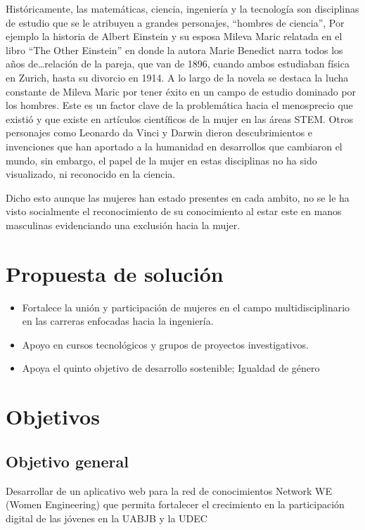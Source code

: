 \documentclass[hidelinks]{Documento}
\begin{document}
Históricamente, las matemáticas, ciencia, ingeniería y la tecnología son disciplinas de estudio que se le atribuyen a grandes personajes, “hombres de ciencia”, Por ejemplo la historia de Albert Einstein y su esposa Mileva Maric relatada en el libro “The Other Einstein” en donde la autora Marie Benedict narra todos los años de…relación de la pareja, que van de 1896, cuando ambos estudiaban física en Zurich, hasta su divorcio en 1914. A lo largo de la novela se destaca la lucha constante de Mileva Maric por tener éxito en un campo de estudio dominado por los hombres. \cite{Jerome2007} Este es un factor clave de la problemática hacia el menosprecio que existió y que existe en artículos científicos de la mujer en las áreas STEM. Otros personajes como Leonardo da Vinci y Darwin dieron descubrimientos e invenciones que han aportado a la humanidad en desarrollos que cambiaron el mundo, sin embargo, el papel de la mujer en estas disciplinas no ha sido visualizado, ni reconocido en la ciencia.

Dicho esto aunque las mujeres han estado presentes en cada ambito, no se le ha visto  socialmente el reconocimiento de su conocimiento al estar este en manos masculinas evidenciando una exclusión hacia la mujer.

\section{Propuesta de solución}

\begin{itemize}
    \item Fortalece la unión y participación de mujeres en el campo multidisciplinario en las carreras enfocadas hacia la ingeniería.
    \item Apoyo en cursos tecnológicos y grupos de proyectos investigativos.
    \item Apoya el quinto objetivo de desarrollo sostenible; Igualdad de género
\end{itemize}

\section{Objetivos}

\subsection{Objetivo general}
Desarrollar de un aplicativo web para la red de conocimientos Network WE (Women Engineering) que permita fortalecer el crecimiento en la participación digital de las jóvenes en la UABJB y la UDEC
\end{document}
